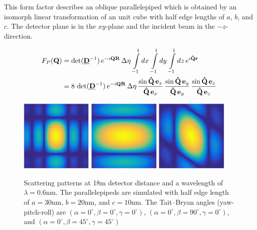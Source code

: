 This form factor describes an oblique parallelepiped which is obtained by an isomorph linear transformation of an unit cube with half edge lengths of $a$, $b$, and $c$. The detector plane is in the $xy$-plane and the incident beam in the $-z$-direction.


\begin{align}
F_P(\B{Q}) &=
\det(\M{D}^{-1})\, e^{-\imath\B{QR}}\, \Delta\eta\, \int\limits_{-1}^1
dx\, \int\limits_{-1}^{1} dy\, \int\limits_{-1}^{1} dz\,
e^{\imath\B{\hat{Q}r}} \nonumber \\
&= \displaystyle
8\, \det(\M{D}^{-1})\, e^{-\imath\B{QR}} \,\Delta\eta\,
\frac{\sin \B{\hat{Q}}\, \B{e}_x}{\B{\hat{Q}}\, \B{e}_x}
\,
\frac{\sin \B{\hat{Q}}\, \B{e}_y}{\B{\hat{Q}}\, \B{e}_y}
\,
\frac{\sin \B{\hat{Q}}\, \B{e}_z}{\B{\hat{Q}}\, \B{e}_z}
\label{eq:form:P}
\end{align}


\begin{figure}[htb] \includegraphics[width=0.31\textwidth]{../images/form_factor/supershapes/parallelepiped_0_0_0_18m.png}
\includegraphics[width=0.31\textwidth]{../images/form_factor/supershapes/parallelepiped_0_90_0_18m.png}   \includegraphics[width=0.31\textwidth]{../images/form_factor/supershapes/parallelepiped_0_45_45_18m.png}
\caption{Scattering patterns at 18m detector distance and a wavelength of $\lambda=0.6$nm. The parallelepipeds are simulated with half edge length of $a=30$nm, $b=20$nm, and $c=10$nm. The Tait–Bryan angles (yaw-pitch-roll) are $(\alpha=0^\circ,\beta=0^\circ,\gamma=0^\circ)$, $(\alpha=0^\circ,\beta=90^\circ,\gamma=0^\circ)$, and $(\alpha=0^\circ,\beta=45^\circ,\gamma=45^\circ)$ }
\label{fig:opo_parallelepipedIQ2D}
\end{figure}

